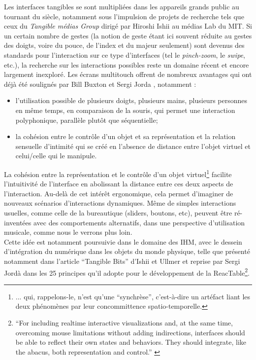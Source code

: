 \indent Les interfaces tangibles se sont multipliées dans les appareils grands public au tournant du siècle, notamment sous l'impulsion de projets de recherche tels que ceux du \textit{Tangible médias Group} dirigé par Hiroshi Ishii au médias Lab du \gls{MIT}. Si un certain nombre de gestes (la notion de geste étant ici souvent réduite au gestes des doigts, voire du pouce, de l'index et du majeur seulement) sont devenus des standards pour l'interaction sur ce type d'interfaces (tel le \textit{pinch-zoom}, le \textit{swipe}, etc.), la recherche sur les interactions possibles reste un domaine récent et encore largement inexploré. Les écrans multitouch offrent de nombreux avantages qui ont déjà été soulignés par Bill Buxton \cite{buxton_multi-touch_2007} et Sergi Jorda \cite{jorda_digital_2005}, notamment :
\vspace{-1em}
\begin{itemize}[noitemsep]
	\item l'utilisation possible de plusieurs doigts, plusieurs mains, plusieurs personnes en même temps, en comparaison de la souris, qui permet une interaction polyphonique, parallèle plutôt que séquentielle;
	\item la cohésion entre le contrôle d'un objet et sa représentation et la relation sensuelle d'intimité qui se créé en l'absence de distance entre l'objet virtuel et celui/celle qui le manipule.
\end{itemize}
\noindent La cohésion entre la représentation et le contrôle d'un objet virtuel\footnote{... qui, rappelons-le, n'est qu'une ``synchrèse'', c'est-à-dire un artéfact liant les deux phénomènes par leur concommittence spatio-temporelle.} facilite l'intuitivité de l'interface en abolissant la distance entre ces deux aspects de l'interaction. Au-delà de cet intérêt ergonomique, cela permet d'imaginer de nouveaux scénarios d'interactions dynamiques. Même de simples interactions usuelles, comme celle de la bureautique (sliders, boutons, etc), peuvent être ré-inventées avec des comportements alternatifs, dans une perspective d'utilisation musicale, comme nous le verrons plus loin.\\
\indent Cette idée est notamment poursuivie dans le domaine des \gls{IHM}, avec le dessein d'intégration du numérique dans les objets du monde physique, telle que présenté notamment dans l'article ``Tangible Bits'' d'Ishii et Ullmer \cite{ishii_tangible_1997} et reprise par Sergi Jordà dans les 25 principes qu'il adopte pour le développement de la ReacTable\footnote{``For including realtime interactive visualizations and, at the same time, overcoming
mouse limitations without adding indirections, interfaces should be able to reflect their own states and behaviors. They should integrate, like the abacus, both representation and control.'' \cite{jorda_digital_2005}}.\\
